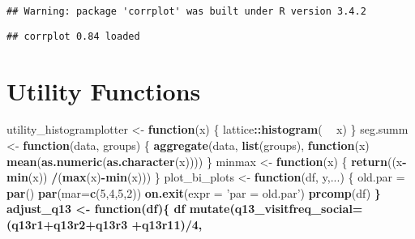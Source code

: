\documentclass[]{article}
\newenvironment{Shaded}{\begin{snugshade}}{\end{snugshade}}
\newcommand{\KeywordTok}[1]{\textcolor[rgb]{0.13,0.29,0.53}{\textbf{#1}}}
\newcommand{\DataTypeTok}[1]{\textcolor[rgb]{0.13,0.29,0.53}{#1}}
\newcommand{\DecValTok}[1]{\textcolor[rgb]{0.00,0.00,0.81}{#1}}
\newcommand{\StringTok}[1]{\textcolor[rgb]{0.31,0.60,0.02}{#1}}
\newcommand{\ControlFlowTok}[1]{\textcolor[rgb]{0.13,0.29,0.53}{\textbf{#1}}}
\newcommand{\OperatorTok}[1]{\textcolor[rgb]{0.81,0.36,0.00}{\textbf{#1}}}
\newcommand{\NormalTok}[1]{#1}
\begin{document}
\begin{verbatim}
## Warning: package 'corrplot' was built under R version 3.4.2
\end{verbatim}

\begin{verbatim}
## corrplot 0.84 loaded
\end{verbatim}

\section{Utility Functions}\label{utility-functions}

\begin{Shaded}
\begin{Highlighting}[]
\NormalTok{utility_histogramplotter <-}\StringTok{ }\ControlFlowTok{function}\NormalTok{(x) \{}
\NormalTok{  lattice}\OperatorTok{::}\KeywordTok{histogram}\NormalTok{( }\OperatorTok{~}\StringTok{ }\NormalTok{x)}
\NormalTok{\}}
\NormalTok{seg.summ <-}\StringTok{ }\ControlFlowTok{function}\NormalTok{(data, groups) \{}
  \KeywordTok{aggregate}\NormalTok{(data, }\KeywordTok{list}\NormalTok{(groups), }\ControlFlowTok{function}\NormalTok{(x) }\KeywordTok{mean}\NormalTok{(}\KeywordTok{as.numeric}\NormalTok{(}\KeywordTok{as.character}\NormalTok{(x))))}
\NormalTok{\}}
\NormalTok{minmax <-}\StringTok{ }\ControlFlowTok{function}\NormalTok{(x)}
\NormalTok{\{}
    \KeywordTok{return}\NormalTok{((x}\OperatorTok{-}\StringTok{ }\KeywordTok{min}\NormalTok{(x)) }\OperatorTok{/}\NormalTok{(}\KeywordTok{max}\NormalTok{(x)}\OperatorTok{-}\KeywordTok{min}\NormalTok{(x)))}
\NormalTok{\}}
\NormalTok{plot_bi_plots <-}\StringTok{ }\ControlFlowTok{function}\NormalTok{(df, y,...) \{}
\NormalTok{  old.par =}\StringTok{ }\KeywordTok{par}\NormalTok{()}
  \KeywordTok{par}\NormalTok{(}\DataTypeTok{mar=}\KeywordTok{c}\NormalTok{(}\DecValTok{5}\NormalTok{,}\DecValTok{4}\NormalTok{,}\DecValTok{5}\NormalTok{,}\DecValTok{2}\NormalTok{))}
  \KeywordTok{on.exit}\NormalTok{(}\DataTypeTok{expr =} \StringTok{'par = old.par'}\NormalTok{)}
  \KeywordTok{prcomp}\NormalTok{(df) }\OperatorTok{%>%}\StringTok{ }\KeywordTok{biplot}\NormalTok{(}\DataTypeTok{col =} \KeywordTok{c}\NormalTok{(}\StringTok{'gray'}\NormalTok{, }\StringTok{'red'}\NormalTok{), }\DataTypeTok{cex =}\NormalTok{ .}\DecValTok{8}\NormalTok{, }\DataTypeTok{main =}\NormalTok{ y, ...)}
\NormalTok{\}}
\NormalTok{adjust_q13 <-}\StringTok{ }\ControlFlowTok{function}\NormalTok{(df)\{}
\NormalTok{  df }\OperatorTok{%<>%}\StringTok{ }
\StringTok{    }\KeywordTok{mutate}\NormalTok{(}\DataTypeTok{q13_visitfreq_social=}\NormalTok{ (q13r1}\OperatorTok{+}\NormalTok{q13r2}\OperatorTok{+}\NormalTok{q13r3 }\OperatorTok{+}\NormalTok{q13r11)}\OperatorTok{/}\DecValTok{4}\NormalTok{,}
}}
\end{Highlighting}
\end{Shaded}
\end{document}
